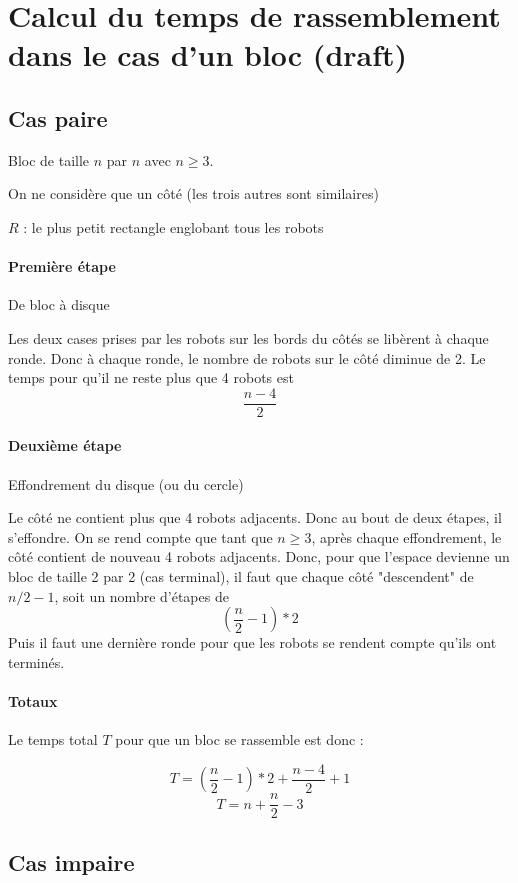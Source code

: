 \documentclass[11pt, a4paper]{article}
\begin{document}
\section{Calcul du temps de rassemblement dans le cas d'un bloc (draft)}

\subsection{Cas paire}

Bloc de taille $n$ par $n$ avec $n \geq 3$.

On ne considère que un côté (les trois autres sont similaires)

$R$ : le plus petit rectangle englobant tous les robots

\paragraph{Première étape} De bloc à disque

Les deux cases prises par les robots sur les bords du côtés se libèrent à
chaque ronde. Donc à chaque ronde, le nombre de robots sur le côté diminue de
2. Le temps pour qu'il ne reste plus que 4 robots est
\[ \frac{n-4}{2} \]

\paragraph{Deuxième étape} Effondrement du disque (ou du cercle)

Le côté ne contient plus que 4 robots adjacents. Donc au bout de deux
étapes, il s'effondre. On se rend compte que tant que $n \geq 3$,
après chaque effondrement, le côté contient de nouveau 4 robots adjacents. Donc,
pour que l'espace devienne un bloc de taille 2 par 2 (cas terminal), il faut
que chaque côté "descendent" de $n/2-1$, soit un nombre d'étapes de
\[ ( \frac{n}{2} -1 ) *2 \]
Puis il faut une dernière ronde pour que les robots se rendent compte qu'ils
ont terminés.

\paragraph{Totaux} Le temps total $T$ pour que un bloc se rassemble
est donc :

\[ T = ( \frac{n}{2} -1 ) *2 + \frac{n-4}{2} + 1 \]
\[ T = n + \frac{n}{2} - 3 \]


\subsection{Cas impaire}
\end{document}
